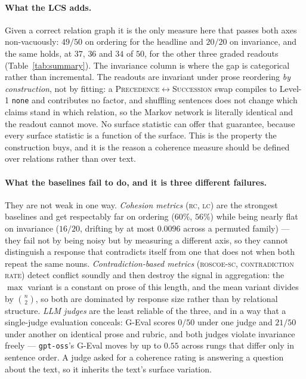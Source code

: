 \paragraph{What the LCS adds.} Given a correct relation graph it is the only measure here that passes
both axes non-vacuously: $49/50$ on ordering for the headline and $20/20$ on invariance, and the same
holds, at $37$, $36$ and $34$ of $50$, for the other three graded readouts (Table~\ref{tab:summary}). The invariance column is where the gap is
categorical rather than incremental. The readouts are invariant under prose reordering \emph{by
construction}, not by fitting: a \textsc{Precedence}$\leftrightarrow$\textsc{Succession} swap compiles
to Level-1 \texttt{none} and contributes no factor, and shuffling sentences does not change which
claims stand in which relation, so the Markov network is literally identical and the readout cannot
move. No surface statistic can offer that guarantee, because every surface statistic is a function of
the surface. This is the property the construction buys, and it is the reason a coherence measure
should be defined over relations rather than over text.

\paragraph{What the baselines fail to do, and it is three different failures.} They are not weak in
one way. \emph{Cohesion metrics} (\textsc{rc}, \textsc{lc}) are the strongest baselines and get
respectably far on ordering ($60\%$, $56\%$) while being nearly flat on invariance ($16/20$, drifting
by at most $0.0096$ across a permuted family) --- they fail not by being noisy but by measuring a
different axis, so they cannot distinguish a response that contradicts itself from one that does not
when both repeat the same nouns. \emph{Contradiction-based metrics} (\textsc{roscoe-sc},
\textsc{contradiction rate}) detect conflict soundly and then destroy the signal in aggregation: the
$\max$ variant is a constant on prose of this length, and the mean variant divides by $\binom{n}{2}$,
so both are dominated by response size rather than by relational structure. \emph{LLM judges} are the
least reliable of the three, and in a way that a single-judge evaluation conceals: G-Eval scores $0/50$
under one judge and $21/50$ under another on identical prose and rubric, and both judges violate
invariance freely --- \texttt{gpt-oss}'s G-Eval moves by up to $0.55$ across rungs that differ only in
sentence order. A judge asked for a coherence rating is answering a question about the text, so it
inherits the text's surface variation.

